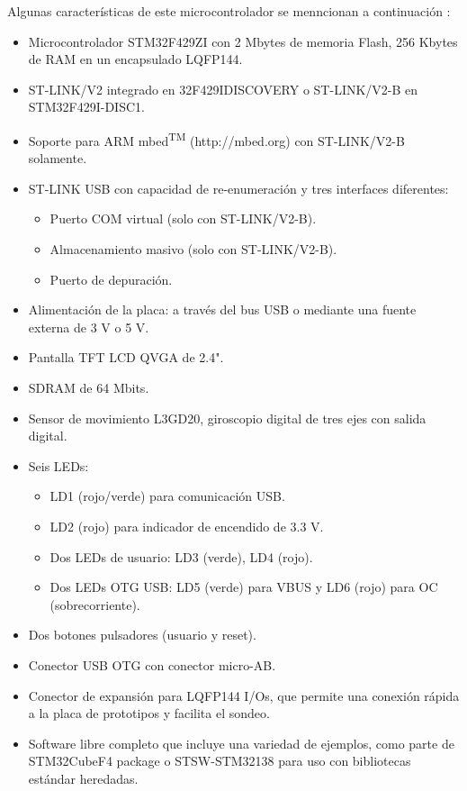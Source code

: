 \documentclass[12pt,a4paper]{article}
\begin{document}
Algunas características de este microcontrolador se menncionan a continuación \cite{hoja}:

\begin{itemize}
    \item Microcontrolador STM32F429ZI con 2 Mbytes de memoria Flash, 256 Kbytes de RAM en un encapsulado LQFP144.
    \item ST-LINK/V2 integrado en 32F429IDISCOVERY o ST-LINK/V2-B en STM32F429I-DISC1.
    \item Soporte para ARM\textsuperscript{\textregistered} mbed\textsuperscript{TM} (http://mbed.org) con ST-LINK/V2-B solamente.
    \item ST-LINK USB con capacidad de re-enumeración y tres interfaces diferentes:
    \begin{itemize}
        \item Puerto COM virtual (solo con ST-LINK/V2-B).
        \item Almacenamiento masivo (solo con ST-LINK/V2-B).
        \item Puerto de depuración.
    \end{itemize}
    \item Alimentación de la placa: a través del bus USB o mediante una fuente externa de 3 V o 5 V.
    \item Pantalla TFT LCD QVGA de 2.4".
    \item SDRAM de 64 Mbits.
    \item Sensor de movimiento L3GD20, giroscopio digital de tres ejes con salida digital.
    \item Seis LEDs:
    \begin{itemize}
        \item LD1 (rojo/verde) para comunicación USB.
        \item LD2 (rojo) para indicador de encendido de 3.3 V.
        \item Dos LEDs de usuario: LD3 (verde), LD4 (rojo).
        \item Dos LEDs OTG USB: LD5 (verde) para VBUS y LD6 (rojo) para OC (sobrecorriente).
    \end{itemize}
    \item Dos botones pulsadores (usuario y reset).
    \item Conector USB OTG con conector micro-AB.
    \item Conector de expansión para LQFP144 I/Os, que permite una conexión rápida a la placa de prototipos y facilita el sondeo.
    \item Software libre completo que incluye una variedad de ejemplos, como parte de STM32CubeF4 package o STSW-STM32138 para uso con bibliotecas estándar heredadas.
\end{itemize}
\end{document}
